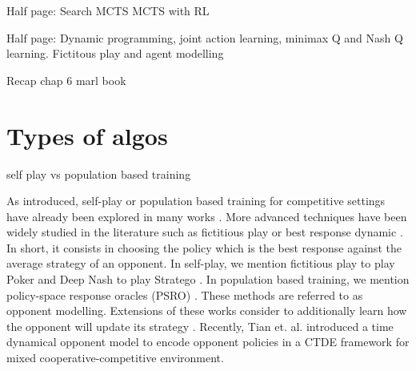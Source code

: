 Half page:
Search
MCTS
MCTS with RL

Half page:
Dynamic programming, joint action learning, minimax Q and Nash Q learning.
Fictitous play and agent modelling

Recap chap 6 marl book


\section{Types of algos}\label{sec:ch6_algo}
self play vs population based training

As introduced, self-play or population based training for competitive settings have already been explored in many works \citep{jaderberg2019human, vinyals2019grandmaster, baker2019emergent}.
More advanced techniques have been widely studied in the literature such as fictitious play \cite{brown1951iterative} or best response dynamic \citep{baudin2022fictitious}.
In short, it consists in choosing the policy which is the best response against the average strategy of an opponent.
In self-play, we mention fictitious play to play Poker \citep{pmlr-v37-heinrich15} and Deep Nash to play Stratego \citep{DM_stratego}.
In population based training, we mention policy-space response oracles (PSRO) \citep{NIPS2017_3323fe11, Muller2020A}.
These methods are referred to as opponent modelling.
Extensions of these works consider to additionally learn how the opponent will update its strategy \citep{he2016opponent, foerster2017learning}.
Recently, Tian et. al. \citep{tian2022multi} introduced a time dynamical opponent model to encode opponent policies in a CTDE framework for mixed cooperative-competitive environment.